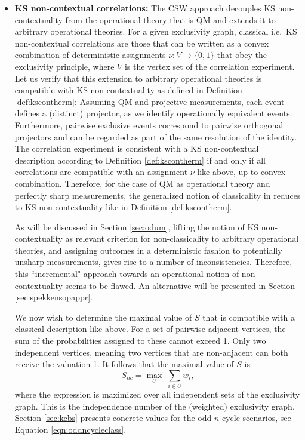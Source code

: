 \begin{itemize}
    \item \textbf{KS non-contextual correlations:}
    The CSW approach decouples KS non-contextuality from the operational theory that is QM and extends it to arbitrary operational theories. For a given exclusivity graph, classical i.e.\ KS non-contextual correlations are those that can be written as a convex combination of deterministic assignments $\nu: V\mapsto\{0,1\}$ that obey the exclusivity principle, where $V$ is the vertex set of the correlation experiment. Let us verify that this extension to arbitrary operational theories is compatible with KS non-contextuality as defined in Definition \ref{def:kscontherm}: Assuming QM and projective measurements, each event defines a (distinct) projector, as we identify operationally equivalent events. Furthermore, pairwise exclusive events correspond to pairwise orthogonal projectors and can be regarded as part of the same resolution of the identity. The correlation experiment is consistent with a KS non-contextual description according to Definition \ref{def:kscontherm} if and only if all correlations are compatible with an assignment $\nu$ like above, up to convex combination. Therefore, for the case of QM as operational theory and perfectly sharp measurements, the generalized notion of classicality in \cite{Cabello2014} reduces to KS non-contextuality like in Definition \ref{def:kscontherm}.
    
    As will be discussed in Section \ref{sec:odum}, lifting the notion of KS non-contextuality as relevant criterion for non-classicality to arbitrary operational theories, and assigning outcomes in a deterministic fashion to potentially unsharp measurements, gives rise to a number of inconsistencies. Therefore, this ``incremental" \cite{Pusey2019} approach towards an operational notion of non-contextuality seems to be flawed. An alternative will be presented in Section \ref{sec:spekkensopappr}.
    
    We now wish to determine the maximal value of $S$ that is compatible with a classical description like above. For a set of pairwise adjacent vertices, the sum of the probabilities assigned to these cannot exceed 1. Only two independent vertices, meaning two vertices that are non-adjacent can both receive the valuation 1. It follows that the maximal value of $S$ is \begin{equation*}
    S_{nc}=\max\limits_{U}\;\sum_{i\in U} w_i,
    \end{equation*}
    where the expression is maximized over all independent sets of the exclusivity graph. This is the independence number of the (weighted) exclusivity graph. Section \ref{sec:kcbs} presents concrete values for the odd $n$-cycle scenarios, see Equation \ref{eqn:oddncycleclass}.
    

\end{itemize}

